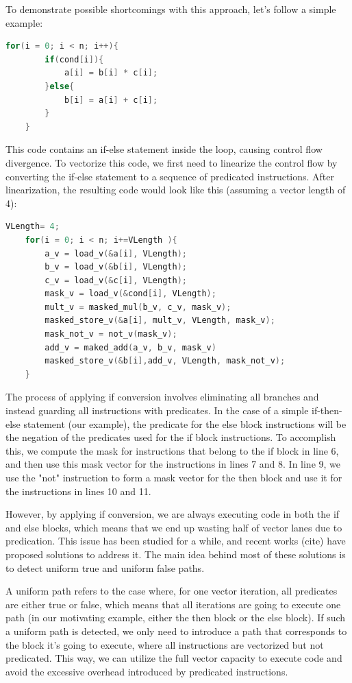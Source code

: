 \documentclass[\main/thesis.tex]{subfiles}
\begin{document}
To demonstrate possible shortcomings with this approach, let's follow a simple example: 
\begin{lstlisting}[language=C, caption={Motivating Example}]
    for(i = 0; i < n; i++){
        if(cond[i]){
            a[i] = b[i] * c[i];
        }else{
            b[i] = a[i] + c[i];
        }
    }
\end{lstlisting}

This code contains an if-else statement inside the loop, causing control flow divergence. To vectorize this code, we first need to linearize the control flow by converting the if-else statement to a sequence of predicated instructions. After linearization, the resulting code would look like this (assuming a vector length of 4):



\begin{lstlisting}[language=C]
    VLength= 4;
    for(i = 0; i < n; i+=VLength ){
        a_v = load_v(&a[i], VLength);
        b_v = load_v(&b[i], VLength);
        c_v = load_v(&c[i], VLength);
        mask_v = load_v(&cond[i], VLength);
        mult_v = masked_mul(b_v, c_v, mask_v);
        masked_store_v(&a[i], mult_v, VLength, mask_v);
        mask_not_v = not_v(mask_v);
        add_v = maked_add(a_v, b_v, mask_v)
        masked_store_v(&b[i],add_v, VLength, mask_not_v);
    }
\end{lstlisting}

The process of applying if conversion involves eliminating all branches and instead guarding all instructions with predicates. In the case of a simple if-then-else statement (our example), the predicate for the else block instructions will be the negation of the predicates used for the if block instructions. To accomplish this, we compute the mask for instructions that belong to the if block in line 6, and then use this mask vector for the instructions in lines 7 and 8. In line 9, we use the "not" instruction to form a mask vector for the then block and use it for the instructions in lines 10 and 11.

However, by applying if conversion, we are always executing code in both the if and else blocks, which means that we end up wasting half of vector lanes due to predication. This issue has been studied for a while, and recent works (cite) have proposed solutions to address it. The main idea behind most of these solutions is to detect uniform true and uniform false paths.

A uniform path refers to the case where, for one vector iteration, all predicates are either true or false, which means that all iterations are going to execute one path (in our motivating example, either the then block or the else block). If such a uniform path is detected, we only need to introduce a path that corresponds to the block it's going to execute, where all instructions are vectorized but not predicated. This way, we can utilize the full vector capacity to execute code and avoid the excessive overhead introduced by predicated instructions.
\end{document}
